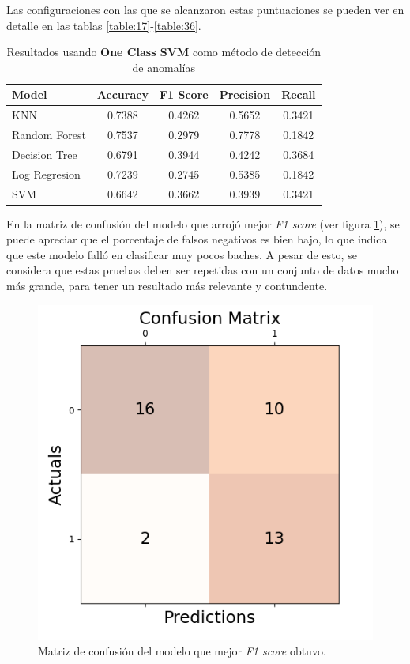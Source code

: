 	Las configuraciones con las que se alcanzaron estas puntuaciones se pueden ver en detalle en las tablas \ref{table:17}-\ref{table:36}.

	\newpage
	\begin{table}[htb]
		\centering
		\caption{Resultados usando \textbf{One Class SVM} como método de detección de anomalías}
		\label{table:16}
		\begin{tabular}{lcccc}
		\toprule
				Model &  Accuracy &  F1 Score &  Precision &  Recall \\
		\midrule
				  KNN &    0.7388 &    0.4262 &     0.5652 &  0.3421 \\
		Random Forest &    0.7537 &    0.2979 &     0.7778 &  0.1842 \\
		Decision Tree &    0.6791 &    0.3944 &     0.4242 &  0.3684 \\
		Log Regresion &    0.7239 &    0.2745 &     0.5385 &  0.1842 \\
				  SVM &    0.6642 &    0.3662 &     0.3939 &  0.3421 \\
		\bottomrule
		\end{tabular}
	\end{table}

	En la matriz de confusión del modelo que arrojó mejor \emph{F1 score} (ver figura \ref{fig:13}), se puede apreciar que el porcentaje de falsos
	negativos es bien bajo, lo que indica que este modelo falló en clasificar muy pocos baches. A pesar de esto, se considera que estas pruebas 
	deben ser repetidas con un conjunto de datos mucho más grande, para tener un resultado más relevante y contundente.

	\begin{figure}[htb]
		\centering
		\includegraphics[scale = 0.6]{Graphics/best_model_confusion_matrix.png}
		\caption{Matriz de confusión del modelo que mejor \emph{F1 score} obtuvo.}
		\label{fig:13}
	\end{figure}

